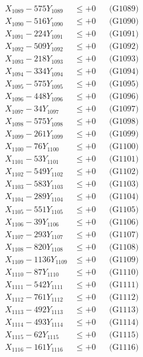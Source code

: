 \documentclass[a4paper,10pt]{article}
\begin{document}
{\begin{align}
X_{1089} - 575Y_{1089} &\leq +0 && \text{(G1089)} \\
X_{1090} - 516Y_{1090} &\leq +0 && \text{(G1090)} \\
\allowbreak
X_{1091} - 224Y_{1091} &\leq +0 && \text{(G1091)} \\
X_{1092} - 509Y_{1092} &\leq +0 && \text{(G1092)} \\
X_{1093} - 218Y_{1093} &\leq +0 && \text{(G1093)} \\
X_{1094} - 334Y_{1094} &\leq +0 && \text{(G1094)} \\
X_{1095} - 575Y_{1095} &\leq +0 && \text{(G1095)} \\
X_{1096} - 448Y_{1096} &\leq +0 && \text{(G1096)} \\
X_{1097} - 34Y_{1097} &\leq +0 && \text{(G1097)} \\
X_{1098} - 575Y_{1098} &\leq +0 && \text{(G1098)} \\
X_{1099} - 261Y_{1099} &\leq +0 && \text{(G1099)} \\
X_{1100} - 76Y_{1100} &\leq +0 && \text{(G1100)} \\
\allowbreak
X_{1101} - 53Y_{1101} &\leq +0 && \text{(G1101)} \\
X_{1102} - 549Y_{1102} &\leq +0 && \text{(G1102)} \\
X_{1103} - 583Y_{1103} &\leq +0 && \text{(G1103)} \\
X_{1104} - 289Y_{1104} &\leq +0 && \text{(G1104)} \\
X_{1105} - 551Y_{1105} &\leq +0 && \text{(G1105)} \\
X_{1106} - 39Y_{1106} &\leq +0 && \text{(G1106)} \\
X_{1107} - 293Y_{1107} &\leq +0 && \text{(G1107)} \\
X_{1108} - 820Y_{1108} &\leq +0 && \text{(G1108)} \\
X_{1109} - 1136Y_{1109} &\leq +0 && \text{(G1109)} \\
X_{1110} - 87Y_{1110} &\leq +0 && \text{(G1110)} \\
\allowbreak
X_{1111} - 542Y_{1111} &\leq +0 && \text{(G1111)} \\
X_{1112} - 761Y_{1112} &\leq +0 && \text{(G1112)} \\
X_{1113} - 492Y_{1113} &\leq +0 && \text{(G1113)} \\
X_{1114} - 493Y_{1114} &\leq +0 && \text{(G1114)} \\
X_{1115} - 62Y_{1115} &\leq +0 && \text{(G1115)} \\
X_{1116} - 161Y_{1116} &\leq +0 && \text{(G1116)} \\

\end{align}}
\end{document}
